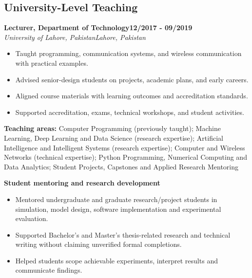 \documentclass[9pt,letterpaper]{extarticle}
\newcommand{\role}[4]{%
  \Needspace{4\baselineskip}\textbf{#1}\hfill\textbf{#2}\\[-1pt]
  \textit{#3}\hfill\textit{#4}\par}
\begin{document}
\subsection{University-Level Teaching}
\role{Lecturer, Department of Technology}{12/2017 - 09/2019}{University of Lahore, Pakistan}{Lahore, Pakistan}
\begin{itemize}
\item Taught programming, communication systems, and wireless communication with practical examples.
\item Advised senior-design students on projects, academic plans, and early careers.
\item Aligned course materials with learning outcomes and accreditation standards.
\item Supported accreditation, exams, technical workshops, and student activities.
\end{itemize}
\vspace{1pt}
{\small\textbf{Teaching areas:} Computer Programming (previously taught); Machine Learning, Deep Learning and Data Science (research expertise); Artificial Intelligence and Intelligent Systems (research expertise); Computer and Wireless Networks (technical expertise); Python Programming, Numerical Computing and Data Analytics; Student Projects, Capstones and Applied Research Mentoring}\par
{}\noindent\textbf{Student mentoring and research development}\par
\begin{itemize}
\item Mentored undergraduate and graduate research/project students in simulation, model design, software implementation and experimental evaluation.
\item Supported Bachelor's and Master's thesis-related research and technical writing without claiming unverified formal completions.
\item Helped students scope achievable experiments, interpret results and communicate findings.
\end{itemize}
\end{document}
